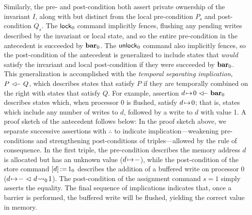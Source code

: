 \documentclass[11pt]{report}         %
\begin{document}
Similarly, the pre- and post-condition both assert private ownership of the invariant $I$, along with but distinct from the local pre-condition $P_s$ and post-condition $Q_s$. The $\operatorname{\mathsf{lock}}_0$ command implicitly fences, flushing any pending writes described by the invariant or local state, and so the entire pre-condition in the antecedent is succeeded by $\mathbf{bar}_{0}$. The $\operatorname{\mathsf{unlock}}_0$ command also implicitly fences, so the post-condition of the antecedent is generalized to include states that \emph{would} satisfy the invariant and local post-condition if they were succeeded by $\mathbf{bar}_{0}$. This generalization is accomplished with the \emph{temporal separating implication}, $P \fseqri Q$, which describes states that satisfy $P$ if they are temporally combined on the right with states that satisfy $Q$. For example, assertion $d \fpointsto 0 \fseqri \fbar{0}$ describes states which, when processor 0 is flushed, satisfy $d \!\mapsto\! 0$; that is, states which include any number of writes to $d$, followed by a write to $d$ with value 1. 
A proof sketch of the antecedent follows below: 
 In the proof sketch above, we separate successive assertions with $\therefore$ to indicate implication---weakening pre-conditions and strengthening post-conditions of triples---allowed by the rule of consequence. In the first triple, the pre-condition describes the memory address $d$ is allocated but has an unknown value ($d \!\mapsto\! -$), while the post-condition of the store command $\left[ d \right] \operatorname{:\!=} 1_0$ describes the addition of a buffered write on processor 0 ($d \!\mapsto\! - \operatorname{\,\vartriangleleft\,} d \!\leadsto_{0}\! 1$). The post-condition of the assignment command $s = 1$ simply asserts the equality. The final sequence of implications indicates that, once a barrier is performed, the buffered write will be flushed, yielding the correct value in memory.  
\end{document}

